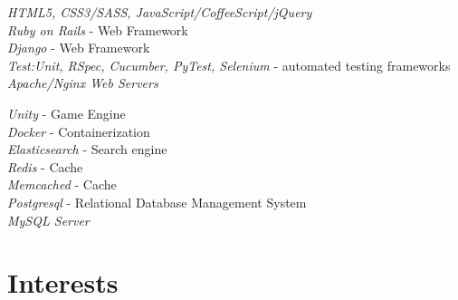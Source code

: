 \documentclass[10pt]{article} %
\begin{document}

{
\textit{HTML5, CSS3/SASS, JavaScript/CoffeeScript/jQuery}\\
\textit{Ruby on Rails} - Web Framework \\
\textit{Django} - Web Framework \\
\textit{Test:Unit, RSpec, Cucumber, PyTest, Selenium} - automated testing frameworks\\
\textit{Apache/Nginx Web Servers}
}


{
\textit{Unity} - Game Engine\\
\textit{Docker} - Containerization \\
\textit{Elasticsearch} - Search engine\\
\textit{Redis} - Cache\\
\textit{Memcached} - Cache\\
\textit{Postgresql} - Relational Database Management System\\
\textit{MySQL Server}
}


\section{Interests}

\end{document}
